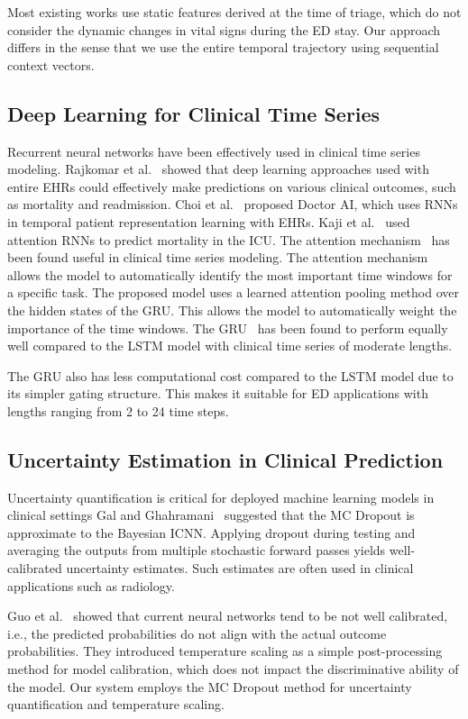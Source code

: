 \documentclass[runningheads]{llncs}
\begin{document}
Most existing works use static features derived at the time of triage, which do not consider the dynamic changes in vital signs during the ED stay. Our approach differs in the sense that we use the entire temporal trajectory using sequential context vectors.

\subsection{Deep Learning for Clinical Time Series}

Recurrent neural networks have been effectively used in clinical time series modeling. Rajkomar et al.~\cite{Rajkomar2018} showed that deep learning approaches used with entire EHRs could effectively make predictions on various clinical outcomes, such as mortality and readmission. Choi et al.~\cite{Choi2016} proposed Doctor AI, which uses RNNs in temporal patient representation learning with EHRs. Kaji et al.~\cite{Kaji2019} used attention RNNs to predict mortality in the ICU. The attention mechanism~\cite{Bahdanau2015} has been found useful in clinical time series modeling. The attention mechanism allows the model to automatically identify the most important time windows for a specific task. The proposed model uses a learned attention pooling method over the hidden states of the GRU. This allows the model to automatically weight the importance of the time windows. The GRU~\cite{Cho2014} has been found to perform equally well compared to the LSTM model with clinical time series of moderate lengths.

The GRU also has less computational cost compared to the LSTM model due to its simpler gating structure. This makes it suitable for ED applications with lengths ranging from 2 to 24 time steps.

\subsection{Uncertainty Estimation in Clinical Prediction}

Uncertainty quantification is critical for deployed machine learning models in clinical settings Gal and Ghahramani~\cite{Gal2016} suggested that the MC Dropout is approximate to the Bayesian ICNN. Applying dropout during testing and averaging the outputs from multiple stochastic forward passes yields well-calibrated uncertainty estimates. Such estimates are often used in clinical applications such as radiology.

Guo et al.~\cite{Guo2017} showed that current neural networks tend to be not well calibrated, i.e., the predicted probabilities do not align with the actual outcome probabilities. They introduced temperature scaling as a simple post-processing method for model calibration, which does not impact the discriminative ability of the model. Our system employs the MC Dropout method for uncertainty quantification and temperature scaling.
\end{document}
